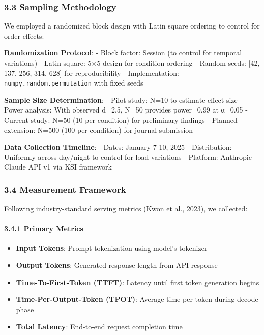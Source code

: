 \documentclass[
  11pt]{article}
\providecommand{\tightlist}{%
  \setlength{\itemsep}{0pt}\setlength{\parskip}{0pt}}
\begin{document}
\subsubsection{3.3 Sampling Methodology}\label{sampling-methodology}

We employed a randomized block design with Latin square ordering to
control for order effects:

\textbf{Randomization Protocol}: - Block factor: Session (to control for
temporal variations) - Latin square: 5×5 design for condition ordering -
Random seeds: {[}42, 137, 256, 314, 628{]} for reproducibility -
Implementation: \texttt{numpy.random.permutation} with fixed seeds

\textbf{Sample Size Determination}: - Pilot study: N=10 to estimate
effect size - Power analysis: With observed d=2.5, N=50 provides
power=0.99 at α=0.05 - Current study: N=50 (10 per condition) for
preliminary findings - Planned extension: N=500 (100 per condition) for
journal submission

\textbf{Data Collection Timeline}: - Dates: January 7-10, 2025 -
Distribution: Uniformly across day/night to control for load variations
- Platform: Anthropic Claude API v1 via KSI framework

\subsubsection{3.4 Measurement Framework}\label{measurement-framework}

Following industry-standard serving metrics (Kwon et al., 2023), we
collected:

\paragraph{3.4.1 Primary Metrics}\label{primary-metrics}

\begin{itemize}
\tightlist
\item
  \textbf{Input Tokens}: Prompt tokenization using model's tokenizer
\item
  \textbf{Output Tokens}: Generated response length from API response
\item
  \textbf{Time-To-First-Token (TTFT)}: Latency until first token
  generation begins
\item
  \textbf{Time-Per-Output-Token (TPOT)}: Average time per token during
  decode phase
\item
  \textbf{Total Latency}: End-to-end request completion time
\end{itemize}
\end{document}
